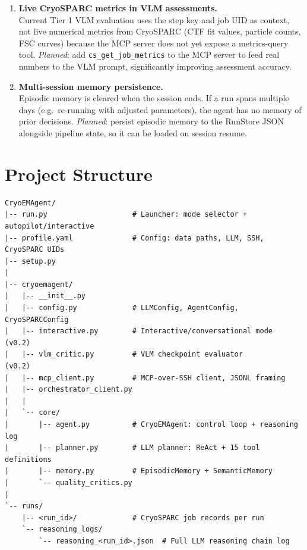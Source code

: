 \documentclass[12pt, a4paper]{article}
\begin{document}
\begin{enumerate}[leftmargin=1.6em, label=\textbf{L\arabic*.}, itemsep=8pt]
\item \textbf{Live CryoSPARC metrics in VLM assessments.}\\
Current Tier 1 VLM evaluation uses the step key and job UID as context,
not live numerical metrics from CryoSPARC (CTF fit values, particle counts,
FSC curves) because the MCP server does not yet expose a metrics-query tool.
\textit{Planned}: add \texttt{cs\_get\_job\_metrics} to the MCP server to
feed real numbers to the VLM prompt, significantly improving assessment
accuracy.

\item \textbf{Multi-session memory persistence.}\\
Episodic memory is cleared when the session ends.
If a run spans multiple days (e.g.\ re-running with adjusted parameters),
the agent has no memory of prior decisions.
\textit{Planned}: persist episodic memory to the RunStore JSON alongside
pipeline state, so it can be loaded on session resume.

\end{enumerate}

\section{Project Structure}
\label{sec:structure}

\begin{lstlisting}[caption={Repository structure}, label=lst:structure,
  numbers=none, frame=single]
CryoEMAgent/
|-- run.py                    # Launcher: mode selector + autopilot/interactive
|-- profile.yaml              # Config: data paths, LLM, SSH, CryoSPARC UIDs
|-- setup.py
|
|-- cryoemagent/
|   |-- __init__.py
|   |-- config.py             # LLMConfig, AgentConfig, CryoSPARCConfig
|   |-- interactive.py        # Interactive/conversational mode  (v0.2)
|   |-- vlm_critic.py         # VLM checkpoint evaluator         (v0.2)
|   |-- mcp_client.py         # MCP-over-SSH client, JSONL framing
|   |-- orchestrator_client.py
|   |
|   `-- core/
|       |-- agent.py          # CryoEMAgent: control loop + reasoning log
|       |-- planner.py        # LLM planner: ReAct + 15 tool definitions
|       |-- memory.py         # EpisodicMemory + SemanticMemory
|       `-- quality_critics.py
|
`-- runs/
    |-- <run_id>/             # CryoSPARC job records per run
    `-- reasoning_logs/
        `-- reasoning_<run_id>.json  # Full LLM reasoning chain log
\end{lstlisting}
\end{document}
